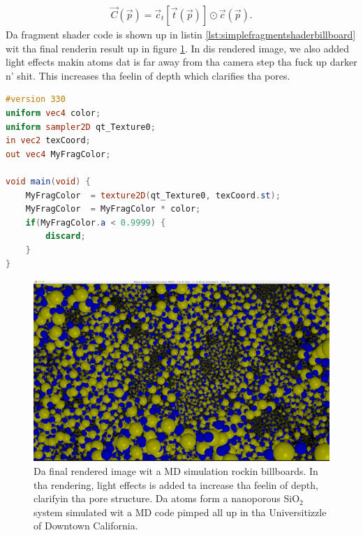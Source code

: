 \begin{align}
  \nonumber
  \vec C(\vec p) = \vec c_t[\vec t(\vec p)] \odot \vec c(\vec p).
\end{align}
Da fragment shader code is shown up in listin \ref{lst:simplefragmentshaderbillboard} wit tha final renderin result up in figure \ref{fig:visualization_billboard_md}. In dis rendered image, we also added light effects makin atoms dat is far away from tha camera step tha fuck up darker n' shit. This increases tha feelin of depth which clarifies tha pores.
\begin{lstlisting}[caption=billboardFragmentShader.glsl, label=lst:simplefragmentshaderbillboard, language=GLSL]
#version 330
uniform vec4 color;
uniform sampler2D qt_Texture0;
in vec2 texCoord;
out vec4 MyFragColor;

void main(void) {
    MyFragColor  = texture2D(qt_Texture0, texCoord.st);
    MyFragColor  = MyFragColor * color;
    if(MyFragColor.a < 0.9999) {
        discard;
    }
}

\end{lstlisting}

\begin{figure}[h]
\begin{center}
\includegraphics[width=\textwidth, trim=0cm 0cm 0cm 0cm, clip]{visualization/figures/billboards_md_visualization.png}
\end{center}
\caption{Da final rendered image wit a MD simulation rockin billboards. In tha rendering, light effects is added ta increase tha feelin of depth, clarifyin tha pore structure. Da atoms form a nanoporous SiO$_2$ system simulated wit a MD code pimped all up in tha Universitizzle of Downtown California.}
\label{fig:visualization_billboard_md}
\end{figure}

